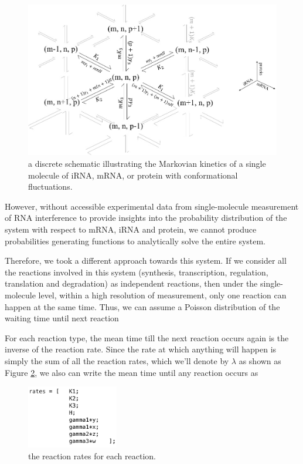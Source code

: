 \documentclass[fleqn,10pt]{wlscirep}
\begin{document}
\begin{figure}[ht]
\centering
\includegraphics[width=\linewidth]{cme}
\caption{a discrete schematic illustrating the Markovian kinetics of a single molecule of iRNA, mRNA, or protein with conformational fluctuations.}
\label{fig:cme}
\end{figure}

However, without accessible experimental data from single-molecule measurement of RNA interference to provide insights into the probability distribution of the system with respect to mRNA, iRNA and protein, we cannot produce probabilities generating functions to analytically solve the entire system.

Therefore, we took a different approach towards this system. If we consider all the reactions involved in this system (synthesis, transcription, regulation, translation and degradation) as independent reactions, then under the single-molecule level, within a high resolution of measurement, only one reaction can happen at the same time. Thus, we can assume a Poisson distribution of the waiting time until next reaction

For each reaction type, the mean time till the next reaction occurs again is the inverse of the reaction rate.  Since the rate at which anything will happen is simply the sum of all the reaction rates, which we'll denote by $\lambda$ as shown as Figure \ref{fig:rate}, we also can write the mean time until any reaction occurs as   
    
\begin{figure}[ht]
\centering
\includegraphics[width=4cm]{rate}
\caption{the reaction rates for each reaction.}
\label{fig:rate} 
\end{figure}
   
\end{document}
